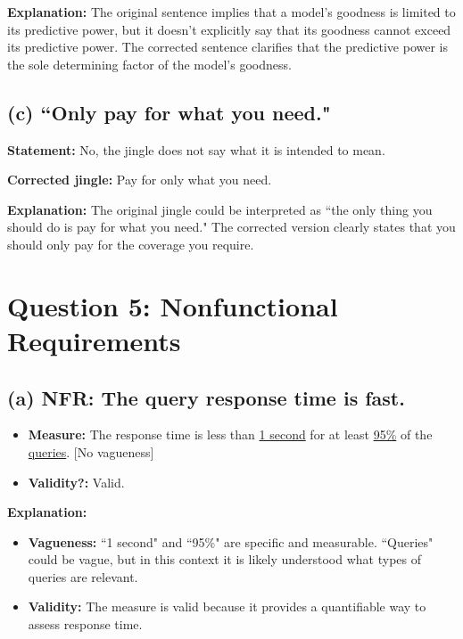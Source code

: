 \documentclass{article}
\begin{document}
\textbf{Explanation:} The original sentence implies that a model's goodness is limited to its predictive power, but it doesn't explicitly say that its goodness cannot exceed its predictive power. The corrected sentence clarifies that the predictive power is the sole determining factor of the model's goodness.

\subsection*{(c) ``Only pay for what you need."}

\textbf{Statement:} No, the jingle does not say what it is intended to mean.

\textbf{Corrected jingle:} Pay for only what you need.

\textbf{Explanation:} The original jingle could be interpreted as ``the only thing you should do is pay for what you need." The corrected version clearly states that you should only pay for the coverage you require.

\section*{Question 5: Nonfunctional Requirements}

\subsection*{(a) NFR: The query response time is fast.}

\begin{itemize}
    \item \textbf{Measure:} The response time is less than \underline{1 second} for at least \underline{95\%} of the \underline{queries}. [No vagueness]
    \item \textbf{Validity?:} Valid.
\end{itemize}

\textbf{Explanation:}

\begin{itemize}
    \item \textbf{Vagueness:} ``1 second" and ``95\%" are specific and measurable. ``Queries" could be vague, but in this context it is likely understood what types of queries are relevant.
    \item \textbf{Validity:} The measure is valid because it provides a quantifiable way to assess response time.
\end{itemize}
\end{document}
